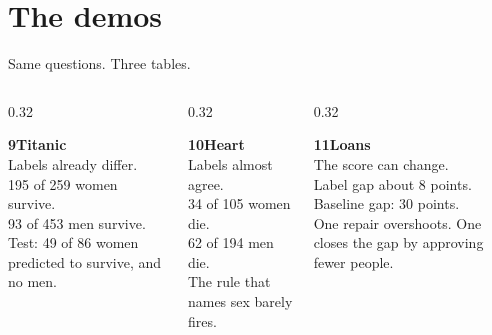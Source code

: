 \documentclass[aspectratio=169,11pt]{beamer}
\begin{document}
\section{The demos}

\begin{frame}{Same questions. Three tables.}
  \small
  \begin{columns}[T]
    \begin{column}{0.32\textwidth}
      \colorbox{ebdcard}{\parbox[t]{0.9\textwidth}{%
        \raggedright
        {\color{ebdnavy}\textbf{9\quad Titanic}}\\[0.3em]
        Labels already differ.\\[0.35em]
        195 of 259 women survive.\\
        93 of 453 men survive.\\[0.3em]
        Test: 49 of 86 women predicted to survive, and no men.\par}}
    \end{column}
    \begin{column}{0.32\textwidth}
      \colorbox{ebdcard}{\parbox[t]{0.9\textwidth}{%
        \raggedright
        {\color{ebdgreen}\textbf{10\quad Heart}}\\[0.3em]
        Labels almost agree.\\[0.35em]
        34 of 105 women die.\\
        62 of 194 men die.\\[0.3em]
        The rule that names sex barely fires.\par}}
    \end{column}
    \begin{column}{0.32\textwidth}
      \colorbox{ebdcard}{\parbox[t]{0.9\textwidth}{%
        \raggedright
        {\color{ebdamber}\textbf{11\quad Loans}}\\[0.3em]
        The score can change.\\[0.35em]
        Label gap about 8 points.\\
        Baseline gap: 30 points.\\[0.3em]
        One repair overshoots. One closes the gap by approving fewer people.\par}}
    \end{column}
  \end{columns}
\end{frame}
\end{document}
